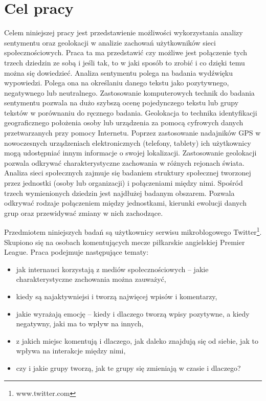 \section{Cel pracy}
Celem niniejszej pracy jest przedstawienie możliwości wykorzystania
analizy sentymentu oraz geolokacji w analizie zachowań użytkowników sieci
społecznościowych. Praca ta ma przedstawić czy możliwe jest połączenie tych
trzech dziedzin ze sobą i jeśli tak, to w jaki sposób to zrobić i co dzięki
temu można się dowiedzieć. 
Analiza sentymentu polega na badania wydźwięku
wypowiedzi. Polega ona na określaniu danego tekstu jako pozytywnego, negatywnego lub neutralnego.
Zastosowanie komputerowych technik do badania sentymentu pozwala na dużo szybszą
ocenę pojedynczego tekstu lub grupy tekstów w porównaniu do ręcznego badania.
Geolokacja to technika identyfikacji geograficznego położenia osoby lub
urządzenia za pomocą cyfrowych danych przetwarzanych przy pomocy Internetu.
Poprzez zastosowanie nadajników GPS w nowoczesnych urządzeniach elektronicznych
(telefony, tablety) ich użytkownicy mogą udostępniać innym informacje o swojej
lokalizacji. Zastosowanie geolokacji pozwala odkrywać charakterystyczne
zachowania w różnych rejonach świata.
Analiza sieci społecznych zajmuje się badaniem struktury społecznej tworzonej
przez jednostki (osoby lub organizacji) i połączeniami między nimi. Spośród
trzech wymienionych dziedzin jest najdłużej badanym obszarem. Pozwala odkrywać
rodzaje połączeniem między jednostkami, kierunki ewolucji danych grup oraz
przewidywać zmiany w nich zachodzące.

Przedmiotem niniejszych badań są użytkownicy serwisu mikroblogowego
Twitter\footnote{www.twitter.com}. Skupiono się na osobach komentujących mecze
piłkarskie angielskiej Premier League. Praca podejmuje następujące tematy:
\begin{itemize}
  \item jak internauci korzystają z mediów społecznościowych -- jakie
  charakterystyczne zachowania można zauważyć,
  \item kiedy są najaktywniejsi i tworzą najwięcej wpisów i komentarzy,
  \item jakie wyrażają emocję -- kiedy i dlaczego tworzą wpisy pozytywne, a
  kiedy negatywny, jaki ma to wpływ na innych,
  \item z jakich miejsc komentują i dlaczego, jak daleko znajdują się od
  siebie, jak to wpływa na interakcje między nimi,
  \item czy i jakie grupy tworzą, jak te grupy się zmieniają w czasie i
  dlaczego?
\end{itemize}

